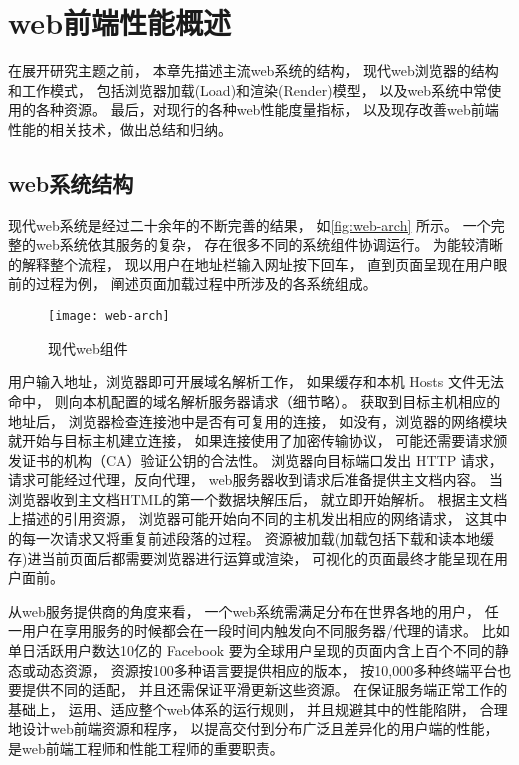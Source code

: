 \chapter{web前端性能概述}
在展开研究主题之前，
本章先描述主流web系统的结构，
现代web浏览器的结构和工作模式，
包括浏览器加载(Load)和渲染(Render)模型，
以及web系统中常使用的各种资源。
最后，对现行的各种web性能度量指标，
以及现存改善web前端性能的相关技术，做出总结和归纳。

\section{web系统结构}

现代web系统是经过二十余年的不断完善的结果，
如\autoref{fig:web-arch} 所示。
一个完整的web系统依其服务的复杂，
存在很多不同的系统组件协调运行。
为能较清晰的解释整个流程，
现以用户在地址栏输入网址按下回车，
直到页面呈现在用户眼前的过程为例，
阐述页面加载过程中所涉及的各系统组成。

\begin{figure}[htbp]
	\centering
	\texttt{[image: web-arch]}
	\caption{现代web组件}\label{fig:web-arch}
\end{figure}

用户输入地址，浏览器即可开展域名解析工作，
如果缓存和本机 Hosts 文件无法命中，
则向本机配置的域名解析服务器请求（细节略）。
获取到目标主机相应的地址后，
浏览器检查连接池中是否有可复用的连接，
如没有，浏览器的网络模块就开始与目标主机建立连接，
如果连接使用了加密传输协议，
可能还需要请求颁发证书的机构（CA）验证公钥的合法性。
浏览器向目标端口发出 HTTP 请求，
请求可能经过代理，反向代理，
web服务器收到请求后准备提供主文档内容。
当浏览器收到主文档HTML的第一个数据块解压后，
就立即开始解析。
根据主文档上描述的引用资源，
浏览器可能开始向不同的主机发出相应的网络请求，
这其中的每一次请求又将重复前述段落的过程。
资源被加载(加载包括下载和读本地缓存)进当前页面后都需要浏览器进行运算或渲染，
可视化的页面最终才能呈现在用户面前。

从web服务提供商的角度来看，
一个web系统需满足分布在世界各地的用户，
任一用户在享用服务的时候都会在一段时间内触发向不同服务器/代理的请求。
比如单日活跃用户数达10亿的 Facebook 要为全球用户呈现的页面内含上百个不同的静态或动态资源\cite{butkiewicz2011}，
资源按100多种语言要提供相应的版本，
按10,000多种终端平台也要提供不同的适配，
并且还需保证平滑更新这些资源。
在保证服务端正常工作的基础上，
运用、适应整个web体系的运行规则，
并且规避其中的性能陷阱，
合理地设计web前端资源和程序，
以提高交付到分布广泛且差异化的用户端的性能，
是web前端工程师和性能工程师的重要职责。

